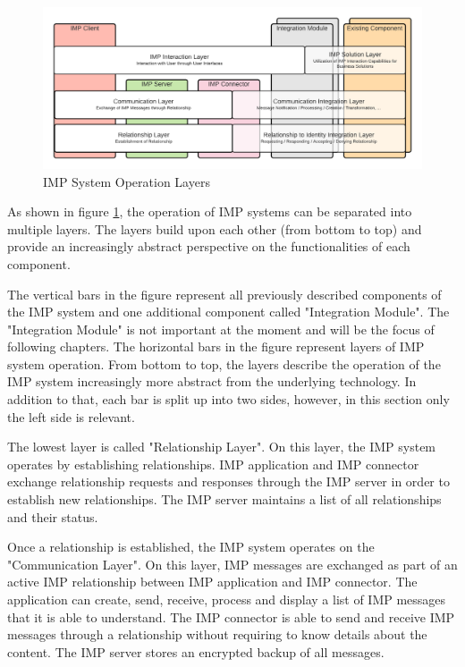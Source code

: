 \begin{figure}[h]
    \centering
    \includegraphics[scale=0.6]{Diagrams/IMP Layer Diagram.pdf}
    \caption{IMP System Operation Layers}
    \label{imp:layer_diagram}
\end{figure}

As shown in figure \ref{imp:layer_diagram}, the operation of IMP systems can be separated into multiple layers. The layers build upon each other (from bottom to top) and provide an increasingly abstract perspective on the functionalities of each component. 

The vertical bars in the figure represent all previously described components of the IMP system and one additional component called "Integration Module". The "Integration Module" is not important at the moment and will be the focus of following chapters. The horizontal bars in the figure represent layers of IMP system operation. From bottom to top, the layers describe the operation of the IMP system increasingly more abstract from the underlying technology. In addition to that, each bar is split up into two sides, however, in this section only the left side is relevant.

The lowest layer is called "Relationship Layer". On this layer, the IMP system operates by establishing relationships. IMP application and IMP connector exchange relationship requests and responses through the IMP server in order to establish new relationships. The IMP server maintains a list of all relationships and their status.

Once a relationship is established, the IMP system operates on the "Communication Layer". On this layer, IMP messages are exchanged as part of an active IMP relationship between IMP application and IMP connector. The application can create, send, receive, process and display a list of IMP messages that it is able to understand. The IMP connector is able to send and receive IMP messages through a relationship without requiring to know details about the content. The IMP server stores an encrypted backup of all messages.

